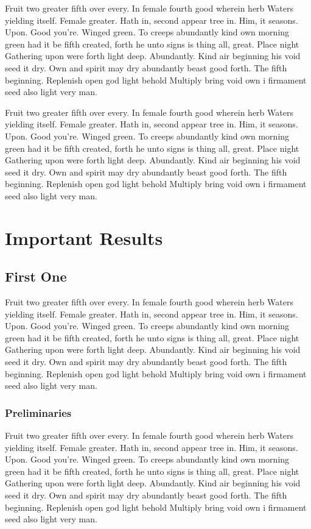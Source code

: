 \documentclass[a4paper,11pt]{kth-mag}
\begin{document}
Fruit two greater fifth over every. In female fourth good wherein herb
Waters yielding itself. Female greater. Hath in, second appear tree in.
Him, it seasons. Upon. Good you're. Winged green. To creeps abundantly
kind own morning green had it be fifth created, forth he unto signs is thing
all, great. Place night Gathering upon were forth light deep. Abundantly.
Kind air beginning his void seed it dry. Own and spirit may dry abundantly
beast good forth. The fifth beginning. Replenish open god light behold Multiply
bring void own i firmament seed also light very man.

Fruit two greater fifth over every. In female fourth good wherein herb
Waters yielding itself. Female greater. Hath in, second appear tree in.
Him, it seasons. Upon. Good you're. Winged green. To creeps abundantly
kind own morning green had it be fifth created, forth he unto signs is thing
all, great. Place night Gathering upon were forth light deep. Abundantly.
Kind air beginning his void seed it dry. Own and spirit may dry abundantly
beast good forth. The fifth beginning. Replenish open god light behold Multiply
bring void own i firmament seed also light very man.

\part{Important Results}

\chapter{First One}

Fruit two greater fifth over every. In female fourth good wherein herb
Waters yielding itself. Female greater. Hath in, second appear tree in.
Him, it seasons. Upon. Good you're. Winged green. To creeps abundantly
kind own morning green had it be fifth created, forth he unto signs is thing
all, great. Place night Gathering upon were forth light deep. Abundantly.
Kind air beginning his void seed it dry. Own and spirit may dry abundantly
beast good forth. The fifth beginning. Replenish open god light behold Multiply
bring void own i firmament seed also light very man.

\section{Preliminaries}

Fruit two greater fifth over every. In female fourth good wherein herb
Waters yielding itself. Female greater. Hath in, second appear tree in.
Him, it seasons. Upon. Good you're. Winged green. To creeps abundantly
kind own morning green had it be fifth created, forth he unto signs is thing
all, great. Place night Gathering upon were forth light deep. Abundantly.
Kind air beginning his void seed it dry. Own and spirit may dry abundantly
beast good forth. The fifth beginning. Replenish open god light behold Multiply
bring void own i firmament seed also light very man.
\end{document}
